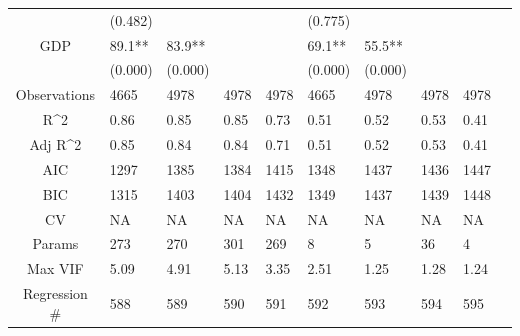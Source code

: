 \documentclass{article}
\begin{document}
\begin{table}[H]
\begin{tabular}{|clllllllll|}
   & (0.482) &  &  &  & (0.775) &  &  &  & \\
  GDP & 89.1** & 83.9** &  &  & 69.1** & 55.5** &  &  & \\
   & (0.000) & (0.000) &  &  & (0.000) & (0.000) &  &  & \\
  \hline
 Observations & 4665 & 4978 & 4978 & 4978 & 4665 & 4978 & 4978 & 4978 & \\
  R^2 & 0.86 & 0.85 & 0.85 & 0.73 & 0.51 & 0.52 & 0.53 & 0.41 & \\
  Adj R^2 & 0.85 & 0.84 & 0.84 & 0.71 & 0.51 & 0.52 & 0.53 & 0.41 & \\
  AIC & 1297 & 1385 & 1384 & 1415 & 1348 & 1437 & 1436 & 1447 & \\
  BIC & 1315 & 1403 & 1404 & 1432 & 1349 & 1437 & 1439 & 1448 & \\
  CV & NA & NA & NA & NA & NA & NA & NA & NA & \\
  Params & 273 & 270 & 301 & 269 & 8 & 5 & 36 & 4 & \\
  Max VIF & 5.09 & 4.91 & 5.13 & 3.35 & 2.51 & 1.25 & 1.28 & 1.24 & \\
  Regression \# & 588 & 589 & 590 & 591 & 592 & 593 & 594 & 595 & \\
   \hline
\end{tabular}

\end{table}
\end{document}
